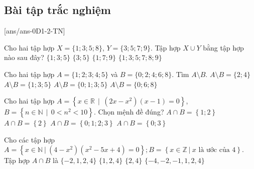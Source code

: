 \subsection{Bài tập trắc nghiệm}
[ans/ans-0D1-2-TN]
\begin{ex}%
	Cho hai tập hợp $X=\{1;3;5;8\}$, $Y=\{3;5;7;9\}$. Tập hợp $X\cup Y$ bằng tập hợp nào sau đây?
	\choice
	{$\{1;3;5\}$}
	{$\{3;5\}$}
	{$\{1;7;9\}$}
	{\True $\{1;3;5;7;8;9\}$}
\end{ex}
\begin{ex}%
	Cho hai tập hợp $A=\{1;2;3;4;5\}$ và $B=\{0;2;4;6;8\}$. Tìm $A\setminus B$.
	\choice
	{$A\setminus B=\{2;4\}$}
	{\True $A\setminus B=\{1;3;5\}$}
	{$A\setminus B=\{0;1;3;5\}$}
	{$A\setminus B=\{0;6;8\}$}
\end{ex}
\begin{ex}%
	Cho hai tập hợp $ A=\left\lbrace x\in \mathbb{R}\,\mid\,(2x-x^2)(x-1)=0 \right\rbrace$, $ B=\left\lbrace n \in \mathbb{N}\,\mid\,0<n^2<10 \right\rbrace$. Chọn mệnh đề đúng?
	\choice
	{\True $A \cap B =\left\lbrace 1;2 \right\rbrace $}
	{$A \cap B =\left\lbrace 2 \right\rbrace $}
	{ $A \cap B =\left\lbrace 0;1;2;3 \right\rbrace $}
	{$A \cap B =\left\lbrace 0;3 \right\rbrace $}
\end{ex}
\begin{ex}%
	Cho các tập hợp $A=\left\{ x\in \mathbb{N} \ | \ (4-x^2)(x^2-5x+4)=0 \right\}; B = \left\{ x\in \mathbb{Z} \ | \ x \text{ là ước của } 4 \right\}$. Tập hợp $A \cap B$ là
	\choice
	{$\{-2,1,2,4\}$}
	{\True $\{1,2,4\}$}
	{$\{2,4\}$}
	{$\{-4,-2,-1,1,2,4\}$}
\end{ex}
